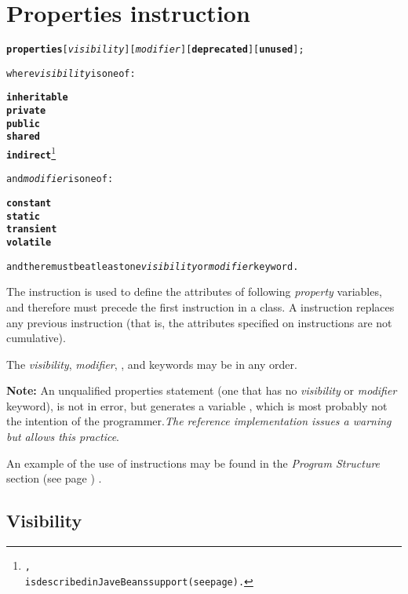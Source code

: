 \section{Properties instruction}\label{refprop}
\begin{shaded}
\begin{alltt}
\textbf{properties} [\emph{visibility}] [\emph{modifier}] [\textbf{deprecated}] [\textbf{unused}];

where \emph{visibility} is one of:

    \textbf{inheritable}
    \textbf{private}
    \textbf{public}
    \textbf{shared}
    \textbf{indirect}\footnote{
,
is described in JaveBeans support (see page \pageref{refappb}) .
}


and \emph{modifier} is one of:

    \textbf{constant}
    \textbf{static}
    \textbf{transient}
    \textbf{volatile}

and there must be at least one \emph{visibility} or \emph{modifier} keyword.
\end{alltt}
\end{shaded}
 
The  instruction is used to define the attributes
of following \emph{property} variables, and therefore must precede the
first  instruction in a class.
A  instruction replaces any previous
 instruction (that is, the attributes specified on
 instructions are not cumulative).
 
The \emph{visibility}, \emph{modifier},
, and  keywords may be in any
order.

\begin{shaded}\noindent
\textbf{Note:} An unqualified properties statement (one that has no
\emph{visibility} or \emph{modifier} keyword), is not in error, but
generates a variable , which is most probably not
the intention of the
programmer.\emph{The reference
  implementation issues a warning but allows this practice}.
\end{shaded}
 
An example of the use of  instructions may be
found in the  \emph{Program Structure} section (see page \pageref{refpstruct}) .
\subsection{Visibility}
 

